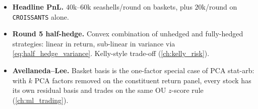 \begin{itemize}
  \texttt{CROISSANTS} and the basket basis. Shifting the band
  by $\pm A$ was worth a material fraction of basket PnL.
  \item \textbf{Headline PnL.} $40$k--$60$k seashells/round on
  baskets, plus $20$k/round on \texttt{CROISSANTS} alone.
  \item \textbf{Round 5 half-hedge.} Convex combination of
  unhedged and fully-hedged strategies: linear in return,
  sub-linear in variance via \eqref{eq:half_hedge_variance}.
  Kelly-style trade-off (\cref{ch:kelly_risk}).
  \item \textbf{Avellaneda--Lee.} Basket basis is the one-factor
  special case of PCA stat-arb: with $k$ PCA factors removed on
  the constituent return panel, every stock has its own residual
  basis and trades on the same OU $z$-score rule
  (\cref{ch:ml_trading}).
\end{itemize}
